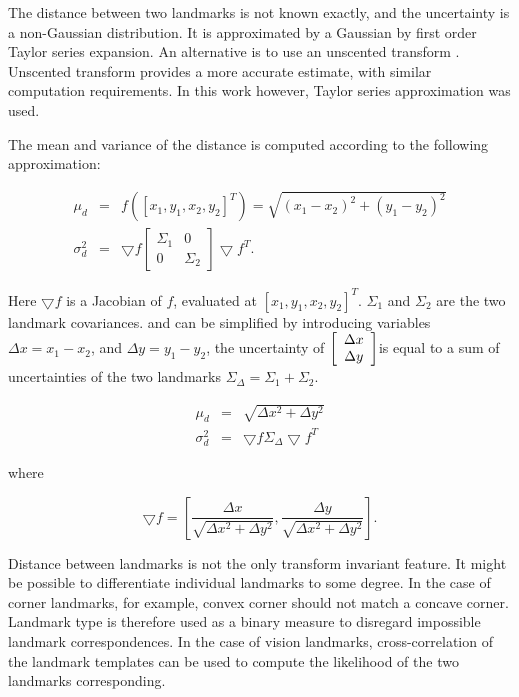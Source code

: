 The distance between two landmarks is not known exactly, and the
uncertainty is a non-Gaussian distribution. It is approximated by a
Gaussian by first order Taylor series expansion. An alternative is to
use an unscented transform \cite{unscented}. Unscented transform
provides a more accurate estimate, with similar computation
requirements. In this work however, Taylor series approximation was
used.

The mean and variance of the distance is computed according to the
following approximation:

\begin{eqnarray}
  \mu_d  &=& f([x_1,y_1,x_2,y_2]^T) = \sqrt{(x_1-x_2)^2 + (y_1-y_2)^2}
\label{eqn:dist_estimate_mu}\\
 \sigma_{d}^2 &=& \bigtriangledown f \left [\begin {array}{cc} \Sigma_1 & 0\\
 0& \Sigma_2 \end{array}\right ] \bigtriangledown f^T.
\label{eqn:dist_estimate_cov}
\end{eqnarray}

Here $\bigtriangledown f$ is a Jacobian of $f$, evaluated at
$[x_1,y_1,x_2,y_2]^T$. $\Sigma_1$ and $\Sigma_2$ are the two landmark
covariances.  and
 can be simplified by introducing
variables $\Delta x = x_1 - x_2$, and $\Delta y = y_1 - y_2$, the
uncertainty of $\left[\begin{array}{c} \Delta x\\ \Delta y \end{array} \right]$is equal to a sum of
uncertainties of the two landmarks $\Sigma_\Delta = \Sigma_1 +
\Sigma_2$.

\begin{eqnarray}
\mu_d &=& \sqrt{\Delta x^2 +\Delta y^2}\\
\sigma_d^2 &=& \bigtriangledown f \Sigma_\Delta \bigtriangledown f^T
\end{eqnarray}

where

$$ 
\bigtriangledown f = \left[
\frac{\Delta x}{\sqrt{\Delta x^2 + \Delta y^2}}, 
\frac{\Delta y}{\sqrt{\Delta x^2 + \Delta y^2}}
\right].
$$


Distance between landmarks is not the only transform invariant
feature. It might be possible to differentiate individual landmarks to
some degree. In the case of corner landmarks, for example, convex
corner should not match a concave corner. Landmark type is therefore
used as a binary measure to disregard impossible landmark
correspondences. In the case of vision landmarks, cross-correlation of
the landmark templates can be used to compute the likelihood of the
two landmarks corresponding.

